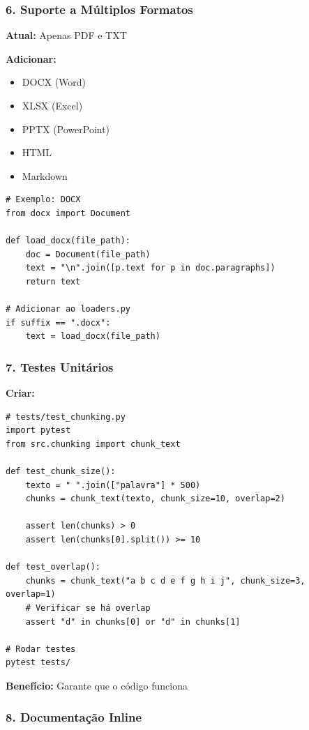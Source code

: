 \documentclass[12pt,a4paper]{article}
\begin{document}
\subsubsection{6. Suporte a Múltiplos Formatos}

\textbf{Atual:} Apenas PDF e TXT

\textbf{Adicionar:}

\begin{itemize}
    \item DOCX (Word)
    \item XLSX (Excel)
    \item PPTX (PowerPoint)
    \item HTML
    \item Markdown
\end{itemize}

\begin{lstlisting}
# Exemplo: DOCX
from docx import Document

def load_docx(file_path):
    doc = Document(file_path)
    text = "\n".join([p.text for p in doc.paragraphs])
    return text

# Adicionar ao loaders.py
if suffix == ".docx":
    text = load_docx(file_path)
\end{lstlisting}

\subsubsection{7. Testes Unitários}

\textbf{Criar:}

\begin{lstlisting}
# tests/test_chunking.py
import pytest
from src.chunking import chunk_text

def test_chunk_size():
    texto = " ".join(["palavra"] * 500)
    chunks = chunk_text(texto, chunk_size=10, overlap=2)
    
    assert len(chunks) > 0
    assert len(chunks[0].split()) >= 10

def test_overlap():
    chunks = chunk_text("a b c d e f g h i j", chunk_size=3, overlap=1)
    # Verificar se há overlap
    assert "d" in chunks[0] or "d" in chunks[1]

# Rodar testes
pytest tests/
\end{lstlisting}

\textbf{Benefício:} Garante que o código funciona

\subsubsection{8. Documentação Inline}
\end{document}
